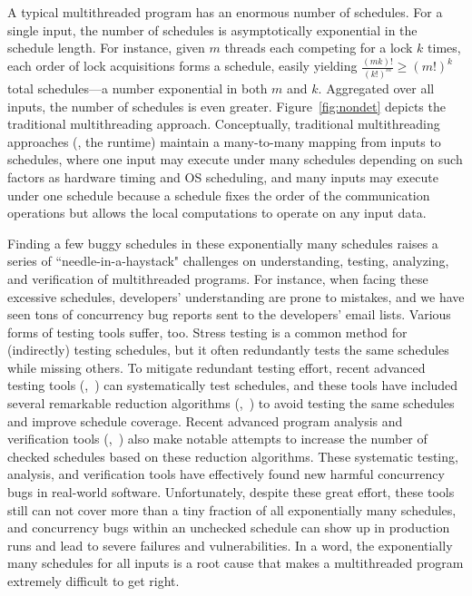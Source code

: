 A typical multithreaded program has an enormous number of schedules.  For
a single input, the number of schedules is asymptotically exponential in
the schedule length.  For instance, given $m$ threads each competing for a
lock $k$ times, each order of lock acquisitions forms a schedule, easily
yielding $\frac{(mk)!}{(k!)^m} \ge (m!)^k$ total schedules---a number
exponential in both $m$ and $k$. Aggregated over all inputs, the number of
schedules is even greater. Figure~\ref{fig:nondet} depicts the traditional
multithreading approach. Conceptually, traditional multithreading approaches
(\eg, the \pthread runtime) maintain a many-to-many mapping from inputs to 
schedules, where one input may execute under many schedules depending on such 
factors as hardware timing and OS scheduling, and many inputs may execute 
under one schedule because a schedule fixes the order of the communication 
operations but allows the local computations to operate on any input data.

Finding a few buggy schedules in these exponentially many schedules raises
a series of ``needle-in-a-haystack" challenges on understanding, testing,
analyzing, and verification of multithreaded programs. For
instance, when facing these excessive schedules, developers' understanding are 
prone to mistakes, and we have seen tons of concurrency bug reports sent to the 
developers' email lists. Various forms of testing tools suffer, too.  Stress 
testing is a common method for (indirectly) testing schedules, but it often 
redundantly tests the same schedules while missing others. To mitigate 
redundant testing effort, recent advanced testing tools 
(\eg,~\cite{musuvathi:chess:osdi08, modist:nsdi09, dbug:ssv10, demeter:sosp11}) 
can systematically test schedules, and these tools have included several 
remarkable reduction algorithms (\eg,~\cite{flanagan:dynamicpo, 
demeter:sosp11}) to avoid testing the same schedules and improve schedule 
coverage. Recent advanced program analysis and verification tools 
(\eg,~\cite{demeter:sosp11}) also make notable attempts to increase the number 
of checked schedules based on these reduction algorithms. These systematic 
testing, analysis, and verification tools have effectively found new harmful 
concurrency bugs in real-world software. Unfortunately, despite these great
effort, these tools still can not cover more than a tiny fraction of all
exponentially many schedules, and concurrency bugs within an unchecked schedule
can show up in production runs and lead to severe failures and vulnerabilities. 
In a word, the exponentially many schedules for all inputs is a 
root cause that makes a multithreaded program extremely difficult to get right.


